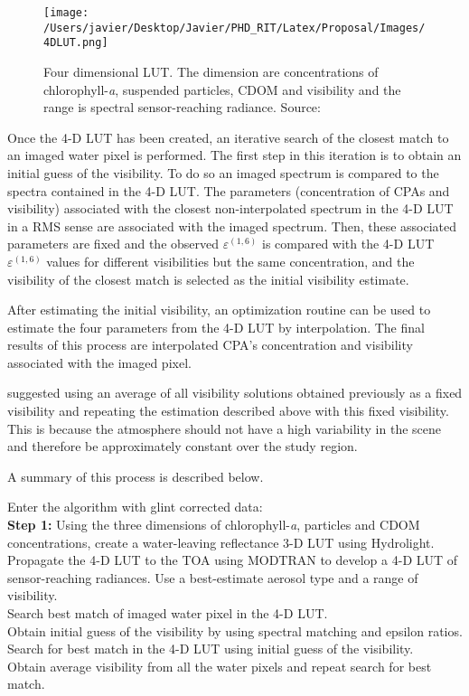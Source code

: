\begin{figure}[htb]
  \centering
  \texttt{[image: /Users/javier/Desktop/Javier/PHD\_RIT/Latex/Proposal/Images/4DLUT.png]}
  \caption{Four dimensional LUT. The dimension are concentrations of chlorophyll-{\it a}, suspended particles, CDOM and visibility and the range is spectral sensor-reaching radiance. Source: \citet{GeraceThesis}}
  \label{fig:4DLUT} 
\end{figure}
Once the 4-D LUT has been created, an iterative search of the closest match to an imaged water pixel is performed. The first step in this iteration is to obtain an initial guess of the visibility. To do so an imaged spectrum is compared to the spectra contained in the 4-D LUT. The parameters (concentration of CPAs and visibility) associated with the closest non-interpolated spectrum in the 4-D LUT in a RMS sense are associated with the imaged spectrum. Then, these associated parameters are fixed and the observed $\varepsilon^{(1,6)}$ is compared with the 4-D LUT $\varepsilon^{(1,6)}$ values for different visibilities but the same concentration, and the visibility of the closest match is selected as the initial visibility estimate.

After estimating the initial visibility, an optimization routine can be used to estimate the four parameters from the 4-D LUT by interpolation. The final results of this process are interpolated CPA's concentration and visibility associated with the imaged pixel.

\citet{GeraceThesis} suggested using an average of all visibility solutions obtained previously as a fixed visibility and repeating the estimation described above with this fixed visibility. This is because the atmosphere should not have a high variability in the scene and therefore be approximately constant over the study region.

A summary of this process is described below.

Enter the algorithm with glint corrected data:\\
{\bf Step 1:} Using the three dimensions of chlorophyll-{\it a}, particles and CDOM concentrations, create a water-leaving reflectance 3-D LUT using Hydrolight.\\
 Propagate the 4-D LUT to the TOA using MODTRAN to develop a 4-D LUT of sensor-reaching radiances. Use a best-estimate aerosol type and a range of visibility.\\
 Search best match of imaged water pixel in the 4-D LUT.\\
 Obtain initial guess of the visibility by using spectral matching and epsilon ratios.\\
 Search for best match in the 4-D LUT using initial guess of the visibility.\\
 Obtain average visibility from all the water pixels and repeat search for best match.\\

